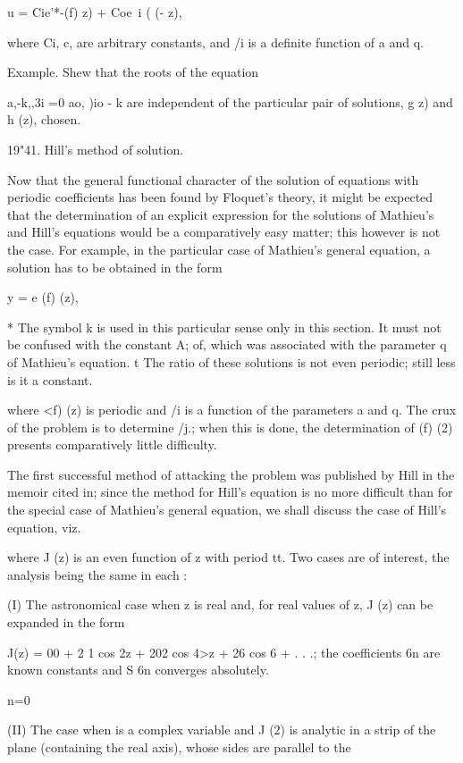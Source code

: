 u = Cie'*-(f) z) + Coe~i ( (- z),

where Ci, c, are arbitrary constants, and /i is a definite function of
a and q.

Example. Shew that the roots of the equation

a,-k,,3i =0 ao, )io - k are independent of the particular pair of
solutions, g z) and h (z), chosen.

19"41. Hill's method of solution.

Now that the general functional character of the solution of equations
with periodic coefficients has been found by Floquet's theory, it
might be expected that the determination of an explicit expression for
the solutions of Mathieu's and Hill's equations would be a
comparatively easy matter; this however is not the case. For example,
in the particular case of Mathieu's general equation, a solution has
to be obtained in the form

y = e (f) (z),

* The symbol k is used in this particular sense only in this section.
It must not be confused with the constant A; of, which was
associated with the parameter q of Mathieu's equation. t The ratio of
these solutions is not even periodic; still less is it a constant.

%
%

where <f) (z) is periodic and /i is a function of the parameters a and
q. The crux of the problem is to determine /j.; when this is done,
the determination of (f) (2) presents comparatively little difficulty.

The first successful method of attacking the problem was published by
Hill in the memoir cited in; since the method for Hill's
equation is no more difficult than for the special case of Mathieu's
general equation, we shall discuss the case of Hill's equation, viz.

where J (z) is an even function of z with period tt. Two cases are of
interest, the analysis being the same in each :

(I) The astronomical case when z is real and, for real values of z, J
(z) can be expanded in the form

J(z) = 00 + 2 1 cos 2z + 202 cos 4>z + 26 cos 6 + . . .; the
coefficients 6n are known constants and S 6n converges absolutely.

n=0

(II) The case when is a complex variable and J (2) is analytic in a
strip of the plane (containing the real axis), whose sides are
parallel to the

